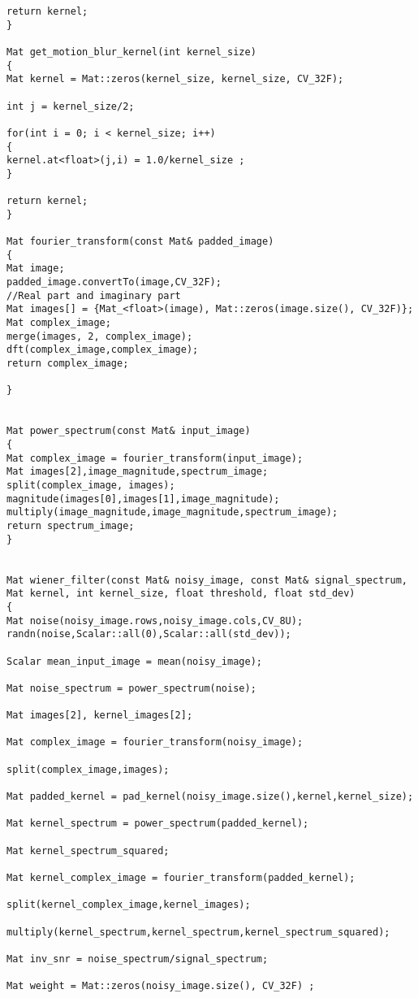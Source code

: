 \begin{lstlisting}
return kernel;
}

Mat get_motion_blur_kernel(int kernel_size)
{
Mat kernel = Mat::zeros(kernel_size, kernel_size, CV_32F);

int j = kernel_size/2;

for(int i = 0; i < kernel_size; i++)
{
kernel.at<float>(j,i) = 1.0/kernel_size ;
}

return kernel;
}

Mat fourier_transform(const Mat& padded_image)
{
Mat image;
padded_image.convertTo(image,CV_32F);
//Real part and imaginary part
Mat images[] = {Mat_<float>(image), Mat::zeros(image.size(), CV_32F)};
Mat complex_image;
merge(images, 2, complex_image);         
dft(complex_image,complex_image);
return complex_image;

}


Mat power_spectrum(const Mat& input_image)
{
Mat complex_image = fourier_transform(input_image);
Mat images[2],image_magnitude,spectrum_image;
split(complex_image, images);
magnitude(images[0],images[1],image_magnitude);
multiply(image_magnitude,image_magnitude,spectrum_image);
return spectrum_image;
}


Mat wiener_filter(const Mat& noisy_image, const Mat& signal_spectrum, Mat kernel, int kernel_size, float threshold, float std_dev)
{
Mat noise(noisy_image.rows,noisy_image.cols,CV_8U);
randn(noise,Scalar::all(0),Scalar::all(std_dev));

Scalar mean_input_image = mean(noisy_image);  

Mat noise_spectrum = power_spectrum(noise);

Mat images[2], kernel_images[2];

Mat complex_image = fourier_transform(noisy_image);

split(complex_image,images);

Mat padded_kernel = pad_kernel(noisy_image.size(),kernel,kernel_size);

Mat kernel_spectrum = power_spectrum(padded_kernel);

Mat kernel_spectrum_squared;

Mat kernel_complex_image = fourier_transform(padded_kernel);

split(kernel_complex_image,kernel_images);

multiply(kernel_spectrum,kernel_spectrum,kernel_spectrum_squared);

Mat inv_snr = noise_spectrum/signal_spectrum;

Mat weight = Mat::zeros(noisy_image.size(), CV_32F) ; 


\end{lstlisting}
